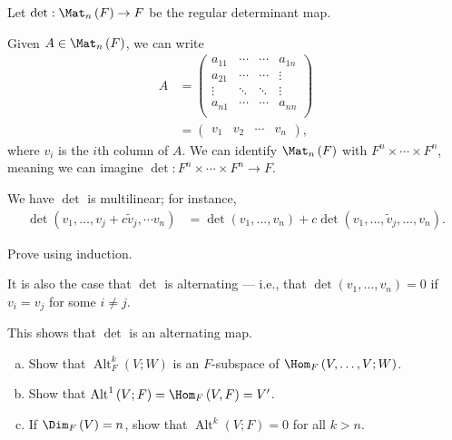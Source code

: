 \documentclass[10pt]{mypackage}
\DeclareMathOperator{\Alt}{Alt}
\begin{document}
  \begin{example}[Determinant]
    Let $\det: \Mat_{n}\left(F\right)\rightarrow F$ be the regular determinant map.\newline

    Given $A\in \Mat_{n}\left(F\right)$, we can write
    \begin{align*}
      A &= \begin{pmatrix}a_{11} & \cdots & \cdots & a_{1n} \\ a_{21} & \cdots &\cdots & \vdots \\ \vdots & \ddots & \ddots & \vdots \\ a_{n1} & \cdots & \cdots & a_{nn}\\ \end{pmatrix}\\
        &= \begin{pmatrix}v_{1} & v_{2} & \cdots & v_{n}\end{pmatrix},
    \end{align*}
    where $v_{i}$ is the $i$th column of $A$. We can identify $\Mat_{n}\left(F\right)$ with $F^n\times\cdots\times F^n$, meaning we can imagine $\det: F^{n}\times\cdots\times F^{n}\rightarrow F$.\newline

    We have $\det$ is multilinear; for instance,
    \begin{align*}
      \det\left(v_1,\dots,v_{j} + c\tilde{v}_j,\cdots v_n\right) &= \det\left(v_1,\dots,v_n\right) + c\det\left(v_1,\dots,\tilde{v}_{j},\dots,v_n\right).
    \end{align*}
    \begin{exercise}
      Prove using induction.
    \end{exercise}
    It is also the case that $\det$ is alternating --- i.e., that $\det\left(v_1,\dots,v_n\right) = 0$ if $v_i = v_j$ for some $i\neq j$.\newline

    This shows that $\det$ is an alternating map.
  \end{example}
  \begin{exercise}\hfill
    \begin{enumerate}[(a)]
      \item Show that $\Alt^{k}_{F}\left(V;W\right)$ is an $F$-subspace of $\Hom_{F}\left(V,\dots,V;W\right)$.
      \item Show that $\Alt^{1}\left(V;F\right) = \Hom_{F}\left(V,F\right) = V'$.
      \item If $\Dim_{F}\left(V\right) = n$, show that $\Alt^{k}\left(V;F\right) = 0$ for all $k > n$.
    \end{enumerate}
  \end{exercise}
\end{document}

